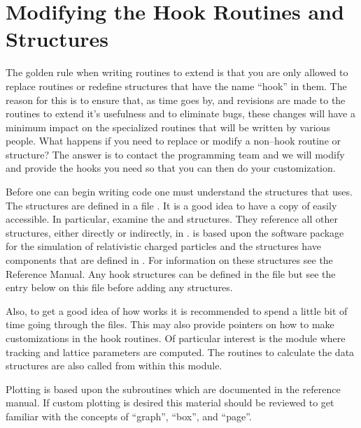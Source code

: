 \section{Modifying the Hook Routines and Structures}

The golden rule when writing routines to extend \tao is that you are
only allowed to replace routines or redefine structures that have the
name ``hook'' in them. The reason for this is to ensure that, as time
goes by, and revisions are made to the \tao routines to extend it's
usefulness and to eliminate bugs, these changes will
have a minimum impact on the specialized routines that will be written
by various people.  What happens if you need to replace
or modify a non--hook routine or structure?  The answer is to contact
the \tao programming team and we will modify \tao and provide the hooks 
you need so that you can then do your customization.

Before one can begin writing code one must understand the structures
that \tao uses. The structures are defined in a file
. It is a good idea to have a copy of
 easily accessible. In particular, examine
the  and 
structures. They reference all other structures, either directly or
indirectly, in .  \tao is based upon the \bmad software
package for the simulation of relativistic charged particles and the
\tao structures have components that are defined in \bmad. For
information on these structures see the \bmad Reference Manual. Any
hook structures can be defined in the file  but
see the entry below on this file before adding any structures.

Also, to get a good idea of how \tao works it is recommended to spend a
little bit of time going through the  files. This may also
provide pointers on how to make customizations in the hook routines. Of
particular interest is the module  where tracking
and lattice parameters are computed. The routines to calculate the data structures
are also called from within this module.

Plotting is based upon the  subroutines which are
documented in the \bmad reference manual. If custom plotting is
desired this material should be reviewed to get familiar with the
concepts of ``graph'', ``box'', and ``page''.


